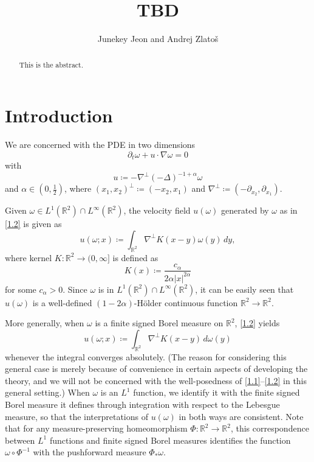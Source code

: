 \documentclass[reqno,centertags,12pt]{amsart}
\theoremstyle{definition}
\numberwithin{equation}{section}
\newcommand{\abs}[1]{\left\lvert#1\right\rvert}
\newcommand{\bbR}{{\mathbb{R}}}
\begin{document}
\title[TBD]
{TBD}

\author{Junekey Jeon and Andrej Zlato\v{s}}

\address{\noindent Department of Mathematics \\ University of
California San Diego \\ La Jolla, CA 92093 \newline Email: \tt
zlatos@ucsd.edu,
j6jeon@ucsd.edu}


\begin{abstract}
    This is the abstract.
\end{abstract}

\maketitle

\section{Introduction}

We are concerned with the PDE in two dimensions
\begin{equation}\label{1.1}
    \partial_{t}\omega + u\cdot\nabla\omega = 0
\end{equation}
with
\begin{equation}\label{1.2}
    u \coloneqq -\nabla^{\perp}(-\Delta)^{-1+\alpha}\omega
\end{equation}
and $\alpha\in\left(0,\frac{1}{2}\right)$, where
$(x_{1},x_{2})^{\perp}\coloneqq(-x_{2},x_{1})$ and
$\nabla^{\perp}\coloneqq(-\partial_{x_{2}},\partial_{x_{1}})$.

Given $\omega\in L^{1}(\bbR^{2})\cap L^{\infty}(\bbR^{2})$,
the velocity field $u(\omega)$ generated by $\omega$ as in \eqref{1.2} is given as
\[
    u(\omega;x) \coloneqq \int_{\bbR^{2}}
    \nabla^{\perp}K(x - y)\omega(y)\,dy,
\]
where kernel $K\colon \bbR^{2}\to(0,\infty]$ is defined as
\[
    K(x)\coloneqq \frac{c_{\alpha}}{2\alpha\abs{x}^{2\alpha}}
\]
for some $c_{\alpha}>0$. Since $\omega$ is in $L^{1}(\bbR^{2})\cap L^{\infty}(\bbR^{2})$,
it can be easily seen that $u(\omega)$ is
a well-defined $(1-2\alpha)$-H\"{o}lder continuous function $\bbR^{2}\to\bbR^{2}$.

More generally, when $\omega$ is a finite signed Borel measure on $\bbR^{2}$,
\eqref{1.2} yields
\[
    u(\omega;x) \coloneqq \int_{\bbR^{2}}
    \nabla^{\perp}K(x - y)\,d\omega(y)
\]
whenever the integral converges absolutely. (The reason for considering this general case
is merely because of convenience in certain aspects of developing the theory, and we will
not be concerned with the well-posedness of \eqref{1.1}--\eqref{1.2} in this general setting.)
When $\omega$ is an $L^{1}$ function, we identify it with the finite signed Borel measure
it defines through integration with respect to the Lebesgue measure, so that
the interpretations of $u(\omega)$ in both ways are consistent.
Note that for any measure-preserving homeomorphism $\Phi\colon\bbR^{2}\to\bbR^{2}$,
this correspondence between $L^{1}$ functions and finite signed Borel measures
identifies the function $\omega\circ\Phi^{-1}$ with the pushforward measure $\Phi_{*}\omega$.
\end{document}
